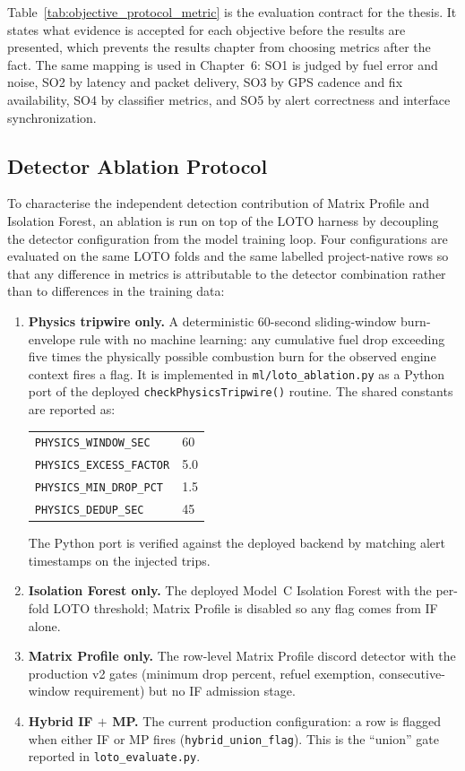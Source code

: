 Table~\ref{tab:objective_protocol_metric} is the evaluation contract for the thesis. It states what evidence is accepted for each objective before the results are presented, which prevents the results chapter from choosing metrics after the fact. The same mapping is used in Chapter~6: SO1 is judged by fuel error and noise, SO2 by latency and packet delivery, SO3 by GPS cadence and fix availability, SO4 by classifier metrics, and SO5 by alert correctness and interface synchronization.

\subsection{Detector Ablation Protocol}
\label{sec:ablation_protocol}

To characterise the independent detection contribution of Matrix Profile and Isolation Forest, an ablation is run on top of the LOTO harness by decoupling the detector configuration from the model training loop. Four configurations are evaluated on the same LOTO folds and the same labelled project-native rows so that any difference in metrics is attributable to the detector combination rather than to differences in the training data:

\begin{enumerate}[label=\textbf{(\alph*)}, leftmargin=*]
\item \textbf{Physics tripwire only.} A deterministic 60-second sliding-window burn-envelope rule with no machine learning: any cumulative fuel drop exceeding five times the physically possible combustion burn for the observed engine context fires a flag. It is implemented in \texttt{ml/loto\_ablation.py} as a Python port of the deployed \texttt{checkPhysicsTripwire()} routine. The shared constants are reported as:
\begin{center}
\footnotesize
\begin{tabular}{@{}ll@{}}
\texttt{PHYSICS\_WINDOW\_SEC} & 60 \\
\texttt{PHYSICS\_EXCESS\_FACTOR} & 5.0 \\
\texttt{PHYSICS\_MIN\_DROP\_PCT} & 1.5 \\
\texttt{PHYSICS\_DEDUP\_SEC} & 45
\end{tabular}
\end{center}
The Python port is verified against the deployed backend by matching alert timestamps on the injected trips.
\item \textbf{Isolation Forest only.} The deployed Model~C Isolation Forest with the per-fold LOTO threshold; Matrix Profile is disabled so any flag comes from IF alone.
\item \textbf{Matrix Profile only.} The row-level Matrix Profile discord detector with the production v2 gates (minimum drop percent, refuel exemption, consecutive-window requirement) but no IF admission stage.
\item \textbf{Hybrid IF $+$ MP.} The current production configuration: a row is flagged when either IF or MP fires (\texttt{hybrid\_\allowbreak union\_\allowbreak flag}). This is the ``union'' gate reported in \texttt{loto\_evaluate.py}.
\end{enumerate}

